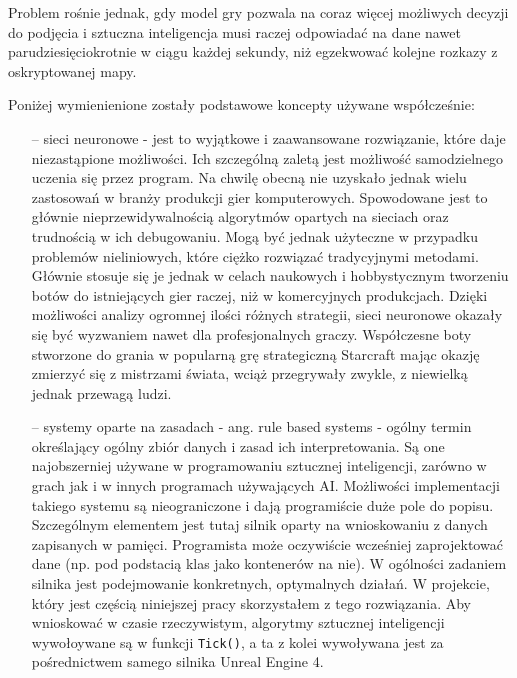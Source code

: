 \documentclass[12pt]{report}
\begin{document}
Problem rośnie jednak, gdy model gry pozwala na coraz więcej możliwych decyzji do podjęcia i sztuczna inteligencja musi raczej odpowiadać na dane nawet parudziesięciokrotnie w ciągu każdej sekundy, niż egzekwować kolejne rozkazy z oskryptowanej mapy. 

Poniżej wymienienione zostały podstawowe koncepty używane współcześnie:
\begin{itemize}
\item[--] sieci neuronowe - jest to wyjątkowe i zaawansowane rozwiązanie, które daje niezastąpione możliwości. Ich szczególną zaletą jest możliwość samodzielnego uczenia się przez program. Na chwilę obecną nie uzyskało jednak wielu zastosowań w branży produkcji gier komputerowych. Spowodowane jest to głównie nieprzewidywalnością algorytmów opartych na sieciach oraz trudnością w ich debugowaniu. Mogą być jednak użyteczne w przypadku problemów nieliniowych, które ciężko rozwiązać tradycyjnymi metodami. Głównie stosuje się je jednak w celach naukowych i hobbystycznym tworzeniu botów do istniejących gier raczej, niż w komercyjnych produkcjach. Dzięki możliwości analizy ogromnej ilości różnych strategii, sieci neuronowe okazały się być wyzwaniem nawet dla profesjonalnych graczy. Współczesne boty stworzone do grania w popularną grę strategiczną Starcraft mając okazję zmierzyć się z mistrzami świata, wciąż przegrywały zwykle, z niewielką jednak przewagą ludzi.
\item[--]  systemy oparte na zasadach - ang. rule based systems - ogólny termin określający ogólny zbiór danych i zasad ich interpretowania. Są one najobszerniej używane w programowaniu sztucznej inteligencji, zarówno w grach jak i w innych programach używających AI. Możliwości implementacji takiego systemu są nieograniczone i dają programiście duże pole do popisu. Szczególnym elementem jest tutaj silnik oparty na wnioskowaniu z danych zapisanych w pamięci. Programista może oczywiście wcześniej zaprojektować dane (np. pod podstacią klas jako kontenerów na nie). W ogólności zadaniem silnika jest podejmowanie konkretnych, optymalnych działań. W projekcie, który jest częścią niniejszej pracy skorzystałem z tego rozwiązania. Aby wnioskować w czasie rzeczywistym, algorytmy sztucznej inteligencji wywołoywane są w funkcji \texttt{\texttt{Tick}()}, a ta z kolei wywoływana jest za pośrednictwem samego silnika Unreal Engine 4.

\end{itemize}
\end{document}
